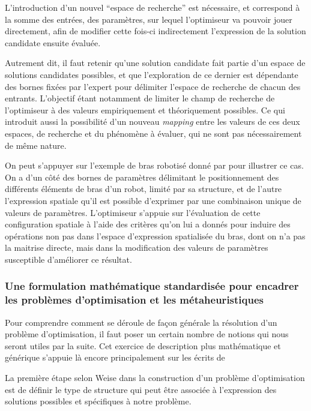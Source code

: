 L'introduction d'un nouvel \enquote{espace de recherche} est nécessaire, et  correspond à la somme des entrées, des paramètres, sur lequel l'optimiseur va pouvoir jouer directement, afin de modifier cette fois-ci indirectement l'expression de la solution candidate ensuite évaluée.

Autrement dit, il faut retenir qu'une solution candidate fait partie d'un espace de solutions candidates possibles, et que l'exploration de ce dernier est dépendante des bornes fixées par l'expert pour délimiter l'espace de recherche de chacun des entrants. L'objectif étant notamment de limiter le champ de recherche de l'optimiseur à des valeurs empiriquement et théoriquement possibles. Ce qui introduit aussi la possibilité d'un nouveau \textit{mapping} entre les valeurs de ces deux espaces, de recherche et du phénomène à évaluer, qui ne sont pas nécessairement de même nature.

On peut s'appuyer sur l'exemple de bras robotisé donné par \autocite{Weise2011} pour illustrer ce cas. On a d'un côté des bornes de paramètres délimitant le positionnement des différents éléments de bras d'un robot, limité par sa structure, et de l'autre l'expression spatiale qu'il est possible d'exprimer par une combinaison unique de valeurs de paramètres. L'optimiseur s'appuie sur l'évaluation de cette configuration spatiale à l'aide des critères qu'on lui a donnés pour induire des opérations non pas dans l'espace d'expression spatialisée du bras, dont on n'a pas la maitrise directe, mais dans la modification des valeurs de paramètres susceptible d'améliorer ce résultat.

\subsubsection{Une formulation mathématique standardisée pour encadrer les problèmes d'optimisation et les métaheuristiques}
\label{sssec:math_opti}


Pour comprendre comment se déroule de façon générale la résolution d'un problème d'optimisation, il faut poser un certain nombre de notions qui nous seront utiles par la suite. Cet exercice de description plus mathématique et générique s'appuie là encore principalement sur les écrits de \textcite{Weise2011}

La première étape selon Weise dans la construction d'un problème d'optimisation est de définir le type de structure qui peut être associée à l'expression des solutions possibles et spécifiques à notre problème.

